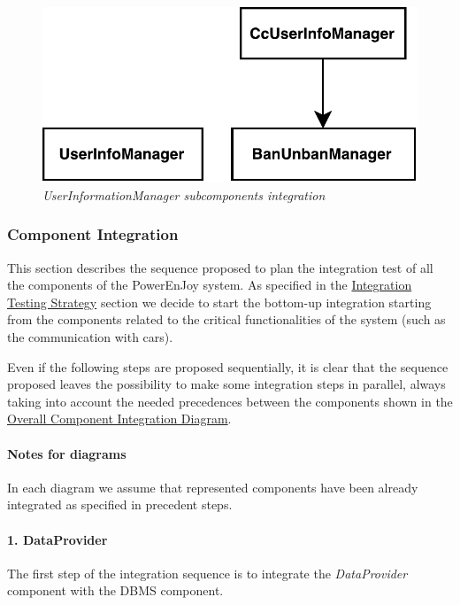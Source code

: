 \paragraph{}

		\begin{figure}[h]
			\centering
			\includegraphics[width=0.4\linewidth]{img/userIntegration}
			\caption{
				\label{fig:userIntegration} 
				\emph{UserInformationManager subcomponents integration}
			}
		\end{figure}

\clearpage 

\subsubsection{Component Integration}
This section describes the sequence proposed to plan the integration test of all the components of the PowerEnJoy system. As specified in the \hyperref[sec:intStrategy]{Integration Testing Strategy}  section  we decide to start the bottom-up integration starting from the components related to the critical functionalities of the system (such as the communication with cars).

Even if the following steps are proposed sequentially, it is clear that the sequence proposed leaves the possibility to make some integration steps in parallel, always taking into account the needed precedences between the components shown in the \hyperref[sec:overallPrecedences]{Overall Component Integration Diagram}.

\paragraph{Notes for diagrams} In each diagram we assume that represented components have been already integrated as specified in precedent steps.

\paragraph{1. DataProvider} 
The first step of the integration sequence is to integrate the \emph{DataProvider} component with the DBMS component.
\paragraph{}

